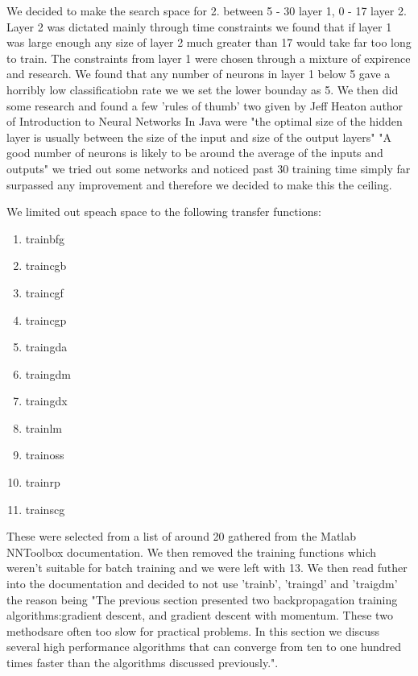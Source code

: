 \documentclass[11pt]{article}
\begin{document}
We decided to make the search space for 2. between 5 - 30 layer 1, 0 - 17 layer 2. Layer 2 was dictated mainly through time
constraints we found that if layer 1 was large enough any size of layer 2 much greater than 17 would take far too long to train.
The constraints from layer 1 were chosen through a mixture of expirence and research. We found that any number of neurons in layer
1 below 5 gave a horribly low classificatiobn rate we we set the lower bounday as 5. We then did some research and found a few 'rules of thumb' two given by Jeff Heaton author of Introduction to Neural Networks In Java were "the optimal size of the hidden layer is usually between the size of the input and size of the output layers" "A good number of neurons is likely to be around the average of the inputs and outputs" we tried out some networks and noticed past 30 training time simply far surpassed any improvement and therefore we decided to make this the ceiling.

We limited out speach space to the following transfer functions:
\begin{multicols}{2}
\begin{enumerate}
  \item trainbfg
  \item traincgb
  \item traincgf
  \item traincgp
  \item traingda
  \item traingdm
  \item traingdx
  \item trainlm
  \item trainoss
  \item trainrp
  \item trainscg 
\end{enumerate}
\end{multicols}

These were selected from a list of around 20 gathered from the Matlab NNToolbox documentation. We then removed the training functions which weren't suitable for batch training and we were left with 13. We then read futher into the documentation and decided to not use 'trainb', 'traingd' and 'traigdm' the reason being "The previous section presented two backpropagation training algorithms:gradient descent, and gradient descent with momentum. These two methodsare often too slow for practical problems. In this section we discuss several high performance algorithms that can converge from ten to one hundred times faster than the algorithms discussed previously.".
\end{document}
